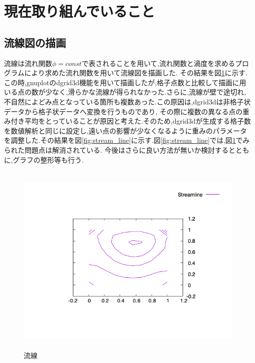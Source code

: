 \documentclass[upLaTeX,a4paper]{jsarticle}
\begin{document}
\section{現在取り組んでいること}
\subsection*{流線図の描画}
流線は流れ関数$\phi = const$で表されることを用いて,流れ関数と渦度を求めるプログラムにより求めた流れ関数を用いて流線図を描画した.
その結果を図\ref{fig:stream_line_wo_param}に示す.この時,gnuplotのdgrid3d機能を用いて描画したが,格子点数と比較して描画に用いる点の数が少なく,滑らかな流線が得られなかった.さらに,流線が壁で途切れ,不自然によどみ点となっている箇所も複数あった.この原因は,dgrid3dは非格子状データから格子状データへ変換を行うものであり,
その際に複数の異なる点の重み付き平均をとっていること\cite{2}が原因と考えた.そのため,dgrid3dが生成する格子数を数値解析と同じに設定し,遠い点の影響が少なくなるように重みのパラメータを調整した.その結果を図\ref{fig:stream_line}に示す.図\ref{fig:stream_line}では,図\ref{fig:stream_line_wo_param}でみられた問題点は解消されている.
今後はさらに良い方法が無いか検討するとともに,グラフの整形等も行う.
\begin{figure}[H]
  \centering
  \includegraphics[height=9.5cm]{outputs/img/stream_line_wo_param.png}
  \caption{流線}
  \label{fig:stream_line_wo_param}
\end{figure}
\end{document}
